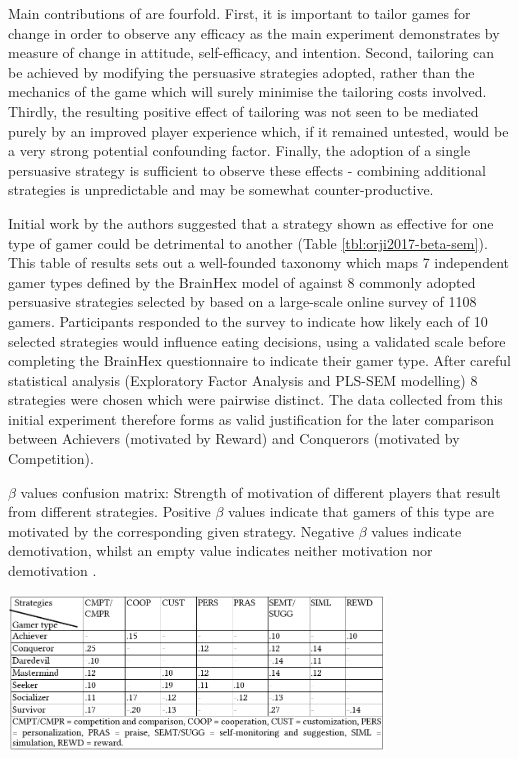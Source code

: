 \documentclass[11pt]{article}
\begin{document}
Main contributions of \citet{orji2017} are fourfold. First, it is important to tailor games for change in order to observe any efficacy as the main experiment demonstrates by measure of change in attitude, self-efficacy, and intention. Second, tailoring can be achieved by modifying the persuasive strategies adopted, rather than the mechanics of the game which will surely minimise the tailoring costs involved. 
Thirdly, the resulting positive effect of tailoring was not seen to be mediated purely by an improved player experience which, if it remained untested, would be a very strong potential confounding factor. Finally, the adoption of a single persuasive strategy is sufficient to observe these effects - combining additional strategies is unpredictable and may be somewhat counter-productive.

Initial work by the authors suggested that a strategy shown as effective for one type of gamer could be detrimental to another \citep{orji2013a} (Table \ref{tbl:orji2017-beta-sem}). This table of results sets out a well-founded taxonomy which maps 7 independent gamer types defined by the BrainHex model of \citet{nacke2014} against 8 commonly adopted persuasive strategies selected by \citet{gerling2014} based on a large-scale online survey of 1108 gamers.  Participants responded to the survey to indicate how likely each of 10 selected strategies would influence eating decisions, using a validated scale \citep{drozd2012} before completing the BrainHex questionnaire to indicate their gamer type. After careful statistical analysis (Exploratory Factor Analysis and PLS-SEM modelling) 8 strategies were chosen which were pairwise distinct. The data collected from this initial experiment therefore forms as valid justification for the later comparison between Achievers (motivated by Reward) and Conquerors (motivated by Competition). 

\begin{table}[H]
\centering
\caption{$\beta$ values confusion matrix: Strength of motivation of different players that result from different strategies. Positive $\beta$ values indicate that gamers of this type are motivated by the corresponding given strategy. Negative $\beta$ values indicate demotivation, whilst an empty value indicates neither motivation nor demotivation \protect\citep{orji2013a}.
}\label{tbl:orji2017-beta-sem}
\includegraphics[width=0.75\textwidth]{img/orji2017-beta-sem.png} 
\end{table}
\end{document}
